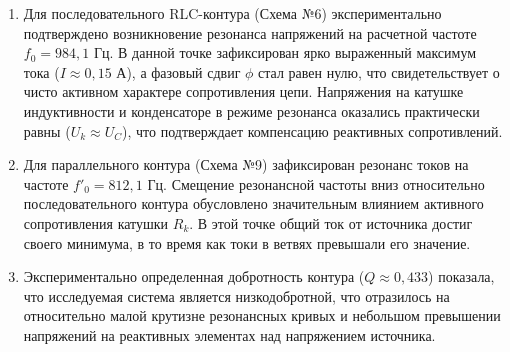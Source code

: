 \documentclass[a4paper,12pt]{article}
\begin{document}
\begin{enumerate}
    \item Для последовательного RLC-контура (Схема №6) экспериментально подтверждено возникновение резонанса напряжений на расчетной частоте $f_0 = 984,1$ Гц. В данной точке зафиксирован ярко выраженный максимум тока ($I \approx 0,15$ А), а фазовый сдвиг $\phi$ стал равен нулю, что свидетельствует о чисто активном характере сопротивления цепи. Напряжения на катушке индуктивности и конденсаторе в режиме резонанса оказались практически равны ($U_k \approx U_C$), что подтверждает компенсацию реактивных сопротивлений.
    \item Для параллельного контура (Схема №9) зафиксирован резонанс токов на частоте $f'_0 = 812,1$ Гц. Смещение резонансной частоты вниз относительно последовательного контура обусловлено значительным влиянием активного сопротивления катушки $R_k$. В этой точке общий ток от источника достиг своего минимума, в то время как токи в ветвях превышали его значение.
    \item Экспериментально определенная добротность контура ($Q \approx 0,433$) показала, что исследуемая система является низкодобротной, что отразилось на относительно малой крутизне резонансных кривых и небольшом превышении напряжений на реактивных элементах над напряжением источника.
\end{enumerate}
\end{document}
